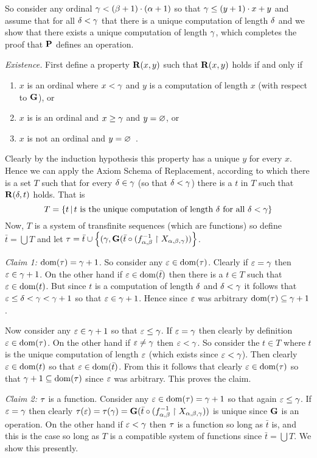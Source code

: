 \begin{solution}
    So consider any ordinal $\g < (\b+1) \cdot (\a+1)$ so that $\g \leq (y+1)\cdot x + y$ and assume that for all $\d < \g$ that there is a unique computation of length $\d$ and we show that there exists a unique computation of length $\g$, which completes the proof that $\P$ defines an operation.

    \emph{Existence.} First define a property $\R(x,y)$ such that $\R(x,y)$ holds if and only if
    \begin{enumerate}
        \item $x$ is an ordinal where $x < \g$ and $y$ is a computation of length $x$ (with respect to $\G$), or
        \item $x$ is is an ordinal and $x \geq \g$ and $y = \es$, or
        \item $x$ is not an ordinal and $y = \es$ \,.
    \end{enumerate}
    Clearly by the induction hypothesis this property has a unique $y$ for every $x$.
    Hence we can apply the Axiom Schema of Replacement, according to which there is a set $T$ such that for every $\d \in \g$ (so that $\d < \g$) there is a $t$ in $T$ such that $\R(\d, t)$ holds.
    That is
    $$
    T = \braces{t \where t \text{ is the unique computation of length $\d$ for all $\d < \g$}}
    $$
    Now, $T$ is a system of transfinite sequences (which are functions) so define $\bar{t} = \bigcup T$ and let $\t = \bar{t} \cup \braces{(\g, \G(\bar{t} \circ (\inv{f_{\a,\b}} \rest X_{\a,\b,\g}))}$.

    \emph{Claim 1:} $\dom(\t) = \g+1$.
    So consider any $\e \in \dom(\t)$.
    Clearly if $\e = \g$ then $\e \in \g+1$.
    On the other hand if $\e \in \dom(\bar{t})$ then there is a $t \in T$ such that $\e \in \dom(t)$.
    But since $t$ is a computation of length $\d$ and $\d < \g$ it follows that $\e \leq \d < \g < \g+1$ so that $\e \in \g+1$.
    Hence since $\e$ was arbitrary $\dom(\t) \ss \g+1$.

    Now consider any $\e \in \g+1$ so that $\e \leq \g$.
    If $\e = \g$ then clearly by definition $\e \in \dom(\t)$.
    On the other hand if $\e \neq \g$ then $\e < \g$.
    So consider the $t \in T$ where $t$ is the unique computation of length $\e$ (which exists since $\e < \g$).
    Then clearly $\e \in \dom(t)$ so that $\e \in \dom(\bar{t})$.
    From this it follows that clearly $\e \in \dom(\t)$ so that $\g+1 \ss \dom(\t)$ since $\e$ was arbitrary.
    This proves the claim.
    
    \emph{Claim 2:} $\t$ is a function.
    Consider any $\e \in \dom(\t) = \g+1$ so that again $\e \leq \g$.
    If $\e = \g$ then clearly $\t(\e) = \t(\g) = \G(\bar{t} \circ (\inv{f_{\a,\b}} \rest X_{\a,\b,\g}))$ is unique since $\G$ is an operation.
    On the other hand if $\e < \g$ then $\t$ is a function so long as $\bar{t}$ is, and this is the case so long as $T$ is a compatible system of functions since $\bar{t} = \bigcup T$.
    We show this presently.


\end{solution}
